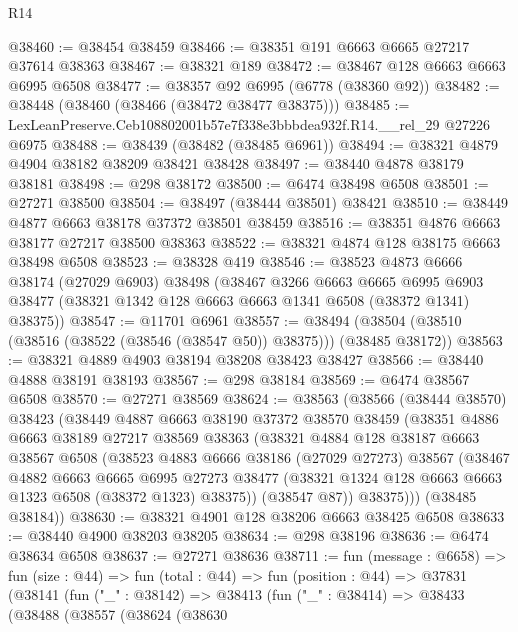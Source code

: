 \begin{lexlean}{R14}
\begin{coremodule}
@38460 := @38454 @38459
@38466 := @38351 @191 @6663 @6665 @27217 @37614 @38363
@38467 := @38321 @189
@38472 := @38467 @128 @6663 @6663 @6995 @6508
@38477 := @38357 @92 @6995 (@6778 (@38360 @92))
@38482 := @38448 (@38460 (@38466 (@38472 @38477 @38375)))
@38485 := LexLeanPreserve.Ceb108802001b57e7f338e3bbbdea932f.R14.__rel_29 @27226 @6975
@38488 := @38439 (@38482 (@38485 @6961))
@38494 := @38321 @4879 @4904 @38182 @38209 @38421 @38428
@38497 := @38440 @4878 @38179 @38181
@38498 := @298 @38172
@38500 := @6474 @38498 @6508
@38501 := @27271 @38500
@38504 := @38497 (@38444 @38501) @38421
@38510 := @38449 @4877 @6663 @38178 @37372 @38501 @38459
@38516 := @38351 @4876 @6663 @38177 @27217 @38500 @38363
@38522 := @38321 @4874 @128 @38175 @6663 @38498 @6508
@38523 := @38328 @419
@38546 := @38523
    @4873
    @6666
    @38174
    (@27029 @6903)
    @38498
    (@38467
      @3266
      @6663
      @6665
      @6995
      @6903
      @38477
      (@38321 @1342 @128 @6663 @6663 @1341 @6508 (@38372 @1341) @38375))
@38547 := @11701 @6961
@38557 := @38494 (@38504 (@38510 (@38516 (@38522 (@38546 (@38547 @50)) @38375))) (@38485 @38172))
@38563 := @38321 @4889 @4903 @38194 @38208 @38423 @38427
@38566 := @38440 @4888 @38191 @38193
@38567 := @298 @38184
@38569 := @6474 @38567 @6508
@38570 := @27271 @38569
@38624 := @38563
    (@38566
      (@38444 @38570)
      @38423
      (@38449
        @4887
        @6663
        @38190
        @37372
        @38570
        @38459
        (@38351
          @4886
          @6663
          @38189
          @27217
          @38569
          @38363
          (@38321
            @4884
            @128
            @38187
            @6663
            @38567
            @6508
            (@38523
              @4883
              @6666
              @38186
              (@27029 @27273)
              @38567
              (@38467
                @4882
                @6663
                @6665
                @6995
                @27273
                @38477
                (@38321 @1324 @128 @6663 @6663 @1323 @6508 (@38372 @1323) @38375))
              (@38547 @87))
            @38375)))
      (@38485 @38184))
@38630 := @38321 @4901 @128 @38206 @6663 @38425 @6508
@38633 := @38440 @4900 @38203 @38205
@38634 := @298 @38196
@38636 := @6474 @38634 @6508
@38637 := @27271 @38636
@38711 := fun (message : @6658) =>
  fun (size : @44) =>
  fun (total : @44) =>
  fun (position : @44) =>
  @37831
    (@38141
      (fun ("_" : @38142) =>
      @38413
        (fun ("_" : @38414) =>
        @38433
          (@38488
            (@38557
              (@38624
                (@38630

\end{coremodule}
\end{lexlean}
